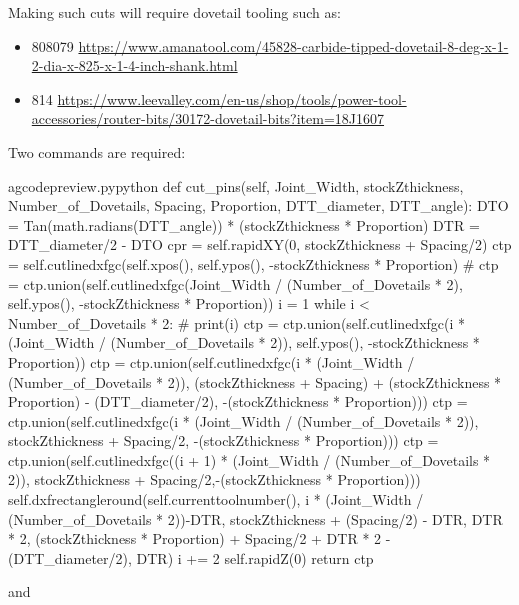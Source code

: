 \documentclass{ltxdoc}
\begin{document}
Making such cuts will require dovetail tooling such as:

\begin{itemize}
\item 808079  \url{https://www.amanatool.com/45828-carbide-tipped-dovetail-8-deg-x-1-2-dia-x-825-x-1-4-inch-shank.html}
\item 814  \url{https://www.leevalley.com/en-us/shop/tools/power-tool-accessories/router-bits/30172-dovetail-bits?item=18J1607}
\end{itemize}

Two commands are required:

\lstset{firstnumber=\thegcpy}
\begin{writecode}{a}{gcodepreview.py}{python}
    def cut_pins(self, Joint_Width, stockZthickness, Number_of_Dovetails, Spacing, Proportion, DTT_diameter, DTT_angle):
        DTO = Tan(math.radians(DTT_angle)) * (stockZthickness * Proportion)
        DTR = DTT_diameter/2 - DTO
        cpr = self.rapidXY(0, stockZthickness + Spacing/2)
        ctp = self.cutlinedxfgc(self.xpos(), self.ypos(), -stockZthickness * Proportion)
#        ctp = ctp.union(self.cutlinedxfgc(Joint_Width / (Number_of_Dovetails * 2), self.ypos(), -stockZthickness * Proportion))
        i = 1
        while i < Number_of_Dovetails * 2:
#            print(i)
            ctp = ctp.union(self.cutlinedxfgc(i * (Joint_Width / (Number_of_Dovetails * 2)), self.ypos(), -stockZthickness * Proportion))
            ctp = ctp.union(self.cutlinedxfgc(i * (Joint_Width / (Number_of_Dovetails * 2)), (stockZthickness + Spacing) + (stockZthickness * Proportion) - (DTT_diameter/2), -(stockZthickness * Proportion)))
            ctp = ctp.union(self.cutlinedxfgc(i * (Joint_Width / (Number_of_Dovetails * 2)), stockZthickness + Spacing/2, -(stockZthickness * Proportion)))
            ctp = ctp.union(self.cutlinedxfgc((i + 1) * (Joint_Width / (Number_of_Dovetails * 2)), stockZthickness + Spacing/2,-(stockZthickness * Proportion)))
            self.dxfrectangleround(self.currenttoolnumber(), 
                i * (Joint_Width / (Number_of_Dovetails * 2))-DTR, 
                stockZthickness + (Spacing/2) - DTR, 
                DTR * 2,
                (stockZthickness * Proportion) + Spacing/2 + DTR * 2 - (DTT_diameter/2), 
                DTR)
            i += 2
        self.rapidZ(0)
        return ctp
    
\end{writecode}
\addtocounter{gcpy}{23}

\noindent and
\end{document}
